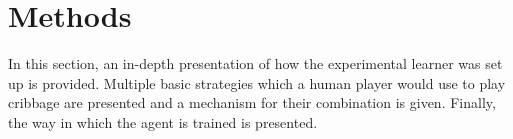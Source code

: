 \section{Methods}
\label{sec:dm}


In this section,
an in-depth presentation of how the experimental learner was set up is provided.
%
Multiple basic strategies which a human player would use to play cribbage are
presented and a mechanism for their combination is given.
%
Finally,
the way in which the agent is trained is presented.



